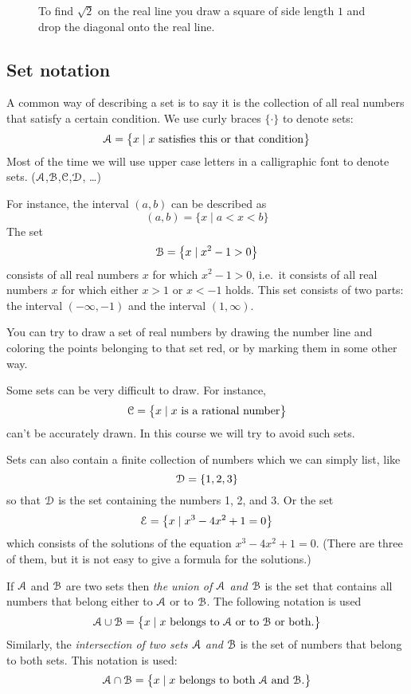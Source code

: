 \begin{figure}[t]\centering
  
  \caption{To find $\sqrt2$ on the real line you draw a square of side length
    $1$ and drop the diagonal onto the real line.}
\end{figure}

\subsection{Set notation} 
\label{sec:set-notation}
A common way of describing a set is to say it is the collection of all
    real numbers that satisfy a certain condition.  We use curly braces $\{
    \cdot \}$ to denote sets:
\[
\mathcal{A} = \bigl\{ x \mid \text{$x$ satisfies this or that condition}\bigr\}
\]
Most of the time we will use upper case letters in a calligraphic font
to denote sets.  ($\mathcal{A}$,$\mathcal{B}$,$\mathcal{C}$,$\mathcal{D}$, \dots)


For instance, the interval $(a, b)$ can be described as
\[
(a, b) = \bigl\{x \mid a<x<b\bigr\}
\]
The set
\[
\mathcal{B} = \bigl\{x \mid x^2-1>0\bigr\}
\]
consists of all real numbers $x$ for which $x^2-1>0$, i.e.\ it consists of all
real numbers $x$ for which either $x>1$ or $x<-1$ holds.  This set consists of
two parts: the interval $(-\infty, -1)$ and the interval $(1, \infty)$.

You can try to draw a set of real numbers by drawing the number line and
coloring the points belonging to that set red, or by marking them in some other
way.


Some sets can be very difficult to draw.  For instance,
\[
\mathcal{C} = \bigl\{x \mid \text{$x$ is a rational number}\bigr\}
\]
can't be accurately drawn.  In this course we will try to avoid such sets.


Sets can also contain a finite collection of numbers which we can simply list, like
\[
\mathcal{D} = \{1, 2, 3\}
\]
so that $\mathcal{D}$ is the set containing the numbers 1, 2, and 3.  Or the set
\[
\mathcal{E} = \bigl\{x \mid x^3-4x^2+1 = 0\bigr\}
\]
which consists of the solutions of the equation $x^3-4x^2+1=0$.
(There are three of them, but it is not easy to give a formula for the
solutions.)


If $\mathcal{A}$ and $\mathcal{B}$ are two sets then \emph{the union of $\mathcal{A}$ and $\mathcal{B}$}
is the set that contains all numbers that belong either to $\mathcal{A}$ or to
$\mathcal{B}$.  The following notation is used
\[
\mathcal{A}\cup\mathcal{B} = \bigl\{x \mid
\text{$x$ belongs to $\mathcal{A}$ or to $\mathcal{B}$ or both.}\bigr\}
\]
Similarly, the \emph{intersection of two sets $\mathcal{A}$ and $\mathcal{B}$} is the set of
numbers that belong to both sets.  This notation is used:
\[
\mathcal{A}\cap\mathcal{B} = \bigl\{x \mid
\text{$x$ belongs to both $\mathcal{A}$ and $\mathcal{B}$.}\bigr\}
\]
